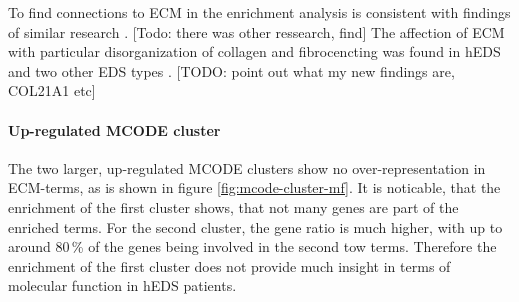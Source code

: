 To find connections to ECM in the enrichment analysis is consistent with findings of similar research \cite{Ritelli2022}. [Todo: there was other ressearch, find] The affection of ECM with particular disorganization of collagen and fibrocencting was found in hEDS and two other EDS types \cite{Chiarelli2018}. [TODO: point out what my new findings are, COL21A1 etc]

\paragraph{Up-regulated MCODE cluster}

The two larger, up-regulated MCODE clusters show no over-representation in ECM-terms, as is shown in figure \ref{fig:mcode-cluster-mf}. It is noticable, that the enrichment of the first cluster shows, that not many genes are part of the enriched terms. For the second cluster, the gene ratio is much higher, with up to around 80\,\% of the genes being involved in the second tow terms. Therefore the enrichment of the first cluster does not provide much insight in terms of molecular function in hEDS patients.

